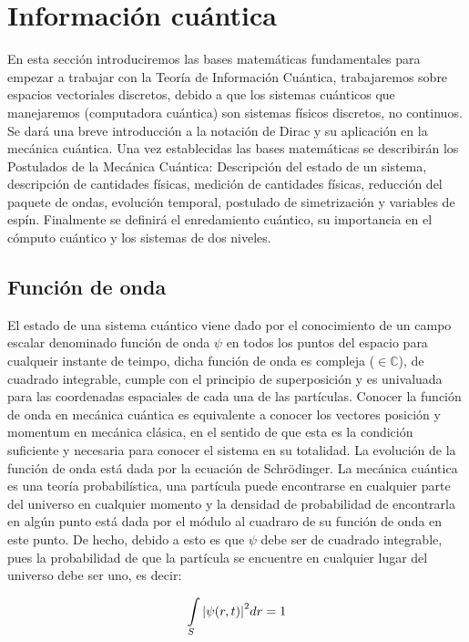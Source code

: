 \chapter{Información cuántica}

En esta sección introduciremos las bases matemáticas fundamentales para empezar a trabajar con la Teoría de Información Cuántica, trabajaremos sobre espacios vectoriales discretos, debido a que los sistemas cuánticos que manejaremos (computadora cuántica) son sistemas físicos discretos, no continuos. Se dará una breve introducción a la notación de Dirac y su aplicación en la mecánica cuántica. Una vez establecidas las bases matemáticas se describirán los Postulados de la Mecánica Cuántica: Descripción del estado de un sistema, descripción de cantidades físicas, medición de cantidades físicas, reducción del paquete de ondas, evolución temporal, postulado de simetrización y variables de espín. Finalmente se definirá el enredamiento cuántico, su importancia en el cómputo cuántico y los sistemas de dos niveles.

\section{Función de onda}

El estado de una sistema cuántico viene dado por el conocimiento de un campo escalar denominado función de onda $\psi$ en todos los puntos del espacio para cualqueir instante de teimpo, dicha función de onda es compleja ($\in \mathds{C}$), de cuadrado integrable, cumple con el principio de superposición y es univaluada para las coordenadas espaciales de cada una de las partículas. Conocer la función de onda en mecánica cuántica es equivalente a conocer los vectores posición y momentum en mecánica clásica, en el sentido de que esta es la condición suficiente y necesaria para conocer el sistema en su totalidad. La evolución de la función de onda está dada por la ecuación de Schrödinger. La mecánica cuántica es una teoría probabilística, una partícula puede encontrarse en cualquier parte del universo en cualquier momento y la densidad de probabilidad de encontrarla en algún punto está dada por el módulo al cuadraro de su función de onda en este punto. De hecho, debido a esto es que $\psi$ debe ser de cuadrado integrable, pues la probabilidad de que la partícula se encuentre en cualquier lugar del universo debe ser uno, es decir:

\begin{equation}
    \int\limits_S \abs{\psi(r,t)}^2 dr = 1
\end{equation}

